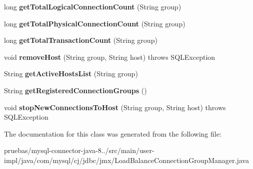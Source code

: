 \begin{DoxyCompactItemize}
long {\bfseries get\+Total\+Logical\+Connection\+Count} (String group)
\item 
\mbox{\label{classcom_1_1mysql_1_1cj_1_1jdbc_1_1jmx_1_1_load_balance_connection_group_manager_a45d77c665ec07e20991eb00c9723d850}} 
long {\bfseries get\+Total\+Physical\+Connection\+Count} (String group)
\item 
\mbox{\label{classcom_1_1mysql_1_1cj_1_1jdbc_1_1jmx_1_1_load_balance_connection_group_manager_a326883b94b5b7d63d55dbfd1db697d6d}} 
long {\bfseries get\+Total\+Transaction\+Count} (String group)
\item 
\mbox{\label{classcom_1_1mysql_1_1cj_1_1jdbc_1_1jmx_1_1_load_balance_connection_group_manager_ae28d9729a8c6bd064b97973376398d92}} 
void {\bfseries remove\+Host} (String group, String host)  throws S\+Q\+L\+Exception 
\item 
\mbox{\label{classcom_1_1mysql_1_1cj_1_1jdbc_1_1jmx_1_1_load_balance_connection_group_manager_a0854bee1fbfa0efc6b1d53db7bc16ae3}} 
String {\bfseries get\+Active\+Hosts\+List} (String group)
\item 
\mbox{\label{classcom_1_1mysql_1_1cj_1_1jdbc_1_1jmx_1_1_load_balance_connection_group_manager_ae388805fdc8aa6608edbf4f7d8e1c649}} 
String {\bfseries get\+Registered\+Connection\+Groups} ()
\item 
\mbox{\label{classcom_1_1mysql_1_1cj_1_1jdbc_1_1jmx_1_1_load_balance_connection_group_manager_aded5d0e2efbd9f4a39e3347da772412a}} 
void {\bfseries stop\+New\+Connections\+To\+Host} (String group, String host)  throws S\+Q\+L\+Exception 
\end{DoxyCompactItemize}


The documentation for this class was generated from the following file\+:\begin{DoxyCompactItemize}
\item 
pruebas/mysql-\/connector-\/java-\/8../src/main/user-\/impl/java/com/mysql/cj/jdbc/jmx/Load\+Balance\+Connection\+Group\+Manager.\+java\end{DoxyCompactItemize}
